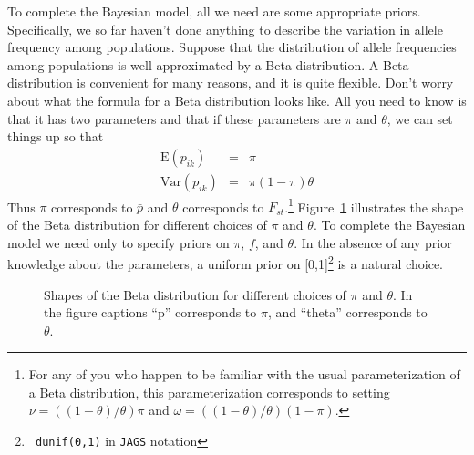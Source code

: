 \documentclass[12pt]{article}
\begin{document}
To complete the Bayesian model, all we need are some appropriate
priors. Specifically, we so far haven't done anything to describe the
variation in allele frequency among populations. Suppose that the
distribution of allele frequencies among populations is
well-approximated by a Beta distribution. A Beta
distribution is convenient for many reasons, and it is quite
flexible. Don't worry about what the formula for a Beta distribution
looks like. All you need to know is that it has two parameters and
that if these parameters are $\pi$ and $\theta$, we can set things up
so that
\begin{eqnarray*}
\mbox{E}(p_{ik}) &=& \pi \\
\mbox{Var}(p_{ik}) &=& \pi(1-\pi)\theta
\end{eqnarray*}
Thus $\pi$ corresponds to $\bar p$ and $\theta$ corresponds to
$F_{st}$.\footnote{For any of you who happen to be familiar with the
usual parameterization of a Beta distribution, this parameterization
corresponds to setting $\nu = ((1-\theta)/\theta)\pi$ and $\omega =
((1-\theta)/\theta)(1-\pi)$.} Figure~\ref{fig:beta} illustrates the
shape of the Beta distribution for different choices of $\pi$ and
$\theta$. To complete the Bayesian model we need only to specify
priors on $\pi$, $f$, and $\theta$. In the absence of any prior
knowledge about the parameters, a uniform prior on [0,1]\footnote{{\tt
dunif(0,1)} in {\tt JAGS} notation} is a natural choice.
\begin{figure}
\caption{Shapes of the Beta distribution for different choices of
  $\pi$ and $\theta$. In the figure captions ``p'' corresponds to $\pi$,
  and ``theta'' corresponds to $\theta$.}\label{fig:beta}
\end{figure}
\end{document}
